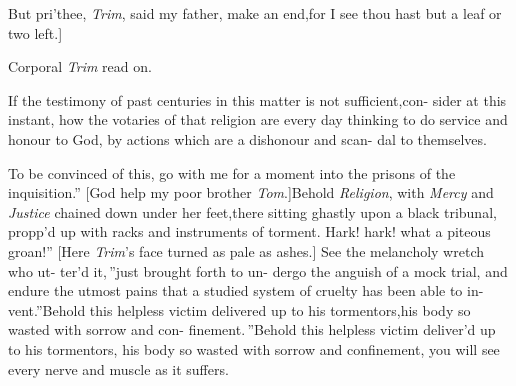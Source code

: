 \documentclass{article}
\begin{document}
But pri’thee, \textit{Trim}, said my father,\break
make an end,\tsk for I see thou hast but a leaf 
or two left.]

\vspace\parskip
\centerline{Corporal \textit{Trim} read on.}

\lqq If the testimony of past centuries\break
\lqq in this matter is not sufficient,\tsk con-\break
\lqq sider at this instant, how the votaries\break
\lqq of that religion are every day thinking\break
\lqq to do service and honour to God, by\break
\lqq actions which are a dishonour and scan-\break
\lqq dal to themselves.

\lqq To be convinced of this, go with\break
\lqq me for a moment into the prisons of\break
\lqq the inquisition.” [God help my poor\break
brother \textit{Tom}.]\tsk \lqq Behold \textit{Religion},
with
\lqq \textit{Mercy} and \textit{Justice} chained down under\break
\lqq her feet,\tsh there sitting ghastly upon\break
\lqq a black tribunal, propp’d up with racks\break
\lqq and instruments of torment. Hark!\break
\lqq \tsk hark!  what a piteous groan!” [Here\break
\textit{Trim}’s face turned as pale as ashes.]\break
\lqq See the melancholy wretch who ut-\break
\lqq ter’d it,\,” \lqq just brought forth to un-\break
\lqq dergo the anguish of a mock trial, and\break
\lqq endure the utmost pains that a studied\break
\lqq system of cruelty has been able to in-\break
\lqq vent.”\tsk \lqq Behold this helpless victim\break
\lqq delivered up to his tormentors,\tsk his\break
\lqq body so wasted with sorrow and con-\break
\lqq finement.\,”\tsh \lqq Behold this helpless\break
\lqq victim deliver’d up to his tormentors,\break
\lqq \tsk his body so wasted with sorrow and\break
\lqq confinement, you will see every nerve\break
\lqq and muscle as it suffers.
\end{document}
